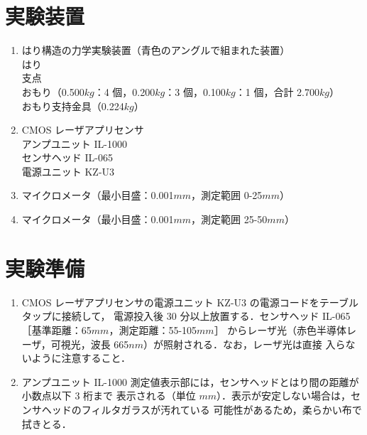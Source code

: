\documentclass[a4paper,11pt]{jsarticle}
\begin{document}
\section{実験装置}
\begin{enumerate}
  \item はり構造の力学実験装置（青色のアングルで組まれた装置）\\
  はり\\
  支点\\
  おもり（0.500$kg$：4 個，0.200$kg$：3 個，0.100$kg$：1 個，合計 2.700$kg$）\\
  おもり支持金具（0.224$kg$）
  \item CMOS レーザアプリセンサ\\
  アンプユニット IL-1000\\
  センサヘッド IL-065\\
  電源ユニット KZ-U3
  \item マイクロメータ（最小目盛：0.001$mm$，測定範囲 0-25$mm$）
  \item マイクロメータ（最小目盛：0.001$mm$，測定範囲 25-50$mm$）
\end{enumerate}

\section{実験準備}
\begin{enumerate}
  \item CMOS レーザアプリセンサの電源ユニット KZ-U3 の電源コードをテーブルタップに接続して，
  電源投入後 30 分以上放置する．センサヘッド IL-065［基準距離：65$mm$，測定距離：55-105$mm$］
  からレーザ光（赤色半導体レーザ，可視光，波長 665$nm$）が照射される．なお，レーザ光は直接
  入らないように注意すること．
  \item アンプユニット IL-1000 測定値表示部には，センサヘッドとはり間の距離が小数点以下 3 桁まで
  表示される（単位 $mm$）．表示が安定しない場合は，センサヘッドのフィルタガラスが汚れている
  可能性があるため，柔らかい布で拭きとる．

\end{enumerate}
\end{document}
